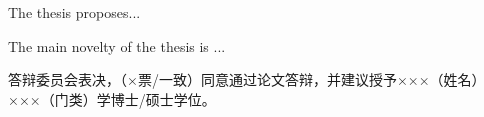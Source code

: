 
\begin{resolution}

  The thesis proposes...
  
  The main novelty of the thesis is ...

  答辩委员会表决，（×票/一致）同意通过论文答辩，并建议授予×××（姓名）×××（门类）学博士/硕士学位。

\end{resolution}
